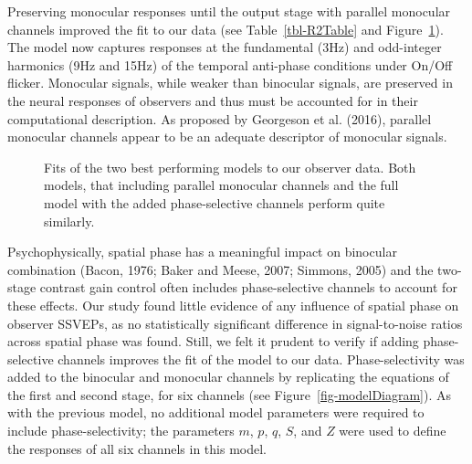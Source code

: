 \documentclass[
  12pt,
]{article}
\begin{document}
Preserving monocular responses until the output stage with parallel
monocular channels improved the fit to our data (see
Table~\ref{tbl-R2Table} and Figure~\ref{fig-bestModels}). The model now
captures responses at the fundamental (3Hz) and odd-integer harmonics
(9Hz and 15Hz) of the temporal anti-phase conditions under On/Off
flicker. Monocular signals, while weaker than binocular signals, are
preserved in the neural responses of observers and thus must be
accounted for in their computational description. As proposed by
Georgeson et al. (2016), parallel monocular channels appear to be an
adequate descriptor of monocular signals.

\begin{figure}


\caption{\label{fig-bestModels}Fits of the two best performing models to
our observer data. Both models, that including parallel monocular
channels and the full model with the added phase-selective channels
perform quite similarly.}

\end{figure}%

Psychophysically, spatial phase has a meaningful impact on binocular
combination (Bacon, 1976; Baker and Meese, 2007; Simmons, 2005) and the
two-stage contrast gain control often includes phase-selective channels
to account for these effects. Our study found little evidence of any
influence of spatial phase on observer SSVEPs, as no statistically
significant difference in signal-to-noise ratios across spatial phase
was found. Still, we felt it prudent to verify if adding phase-selective
channels improves the fit of the model to our data. Phase-selectivity
was added to the binocular and monocular channels by replicating the
equations of the first and second stage, for six channels (see
Figure~\ref{fig-modelDiagram}). As with the previous model, no
additional model parameters were required to include phase-selectivity;
the parameters \(m\), \(p\), \(q\), \(S\), and \(Z\) were used to define
the responses of all six channels in this model.
\end{document}
